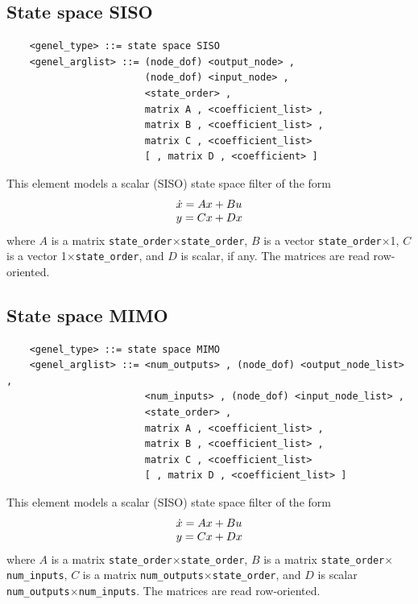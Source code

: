 \subsection{State space SISO}
\begin{verbatim}
    <genel_type> ::= state space SISO
    <genel_arglist> ::= (node_dof) <output_node> ,
                        (node_dof) <input_node> ,
                        <state_order> ,
                        matrix A , <coefficient_list> ,
                        matrix B , <coefficient_list> ,
                        matrix C , <coefficient_list>
                        [ , matrix D , <coefficient> ]
\end{verbatim}
This element models a scalar (SISO) state space filter of the form
\begin{displaymath}
    \begin{array}{l}  
        \dot{x} = Ax+Bu \\
	y = Cx+Dx
     \end{array}
\end{displaymath}
where $ A $ is a matrix \texttt{state\_order}$\times$\texttt{state\_order},
$ B $ is a vector \texttt{state\_order}$\times$1,
$ C $ is a vector 1$\times$\texttt{state\_order},
and $ D $ is scalar, if any.
The matrices are read row-oriented.

\subsection{State space MIMO}
\begin{verbatim}
    <genel_type> ::= state space MIMO
    <genel_arglist> ::= <num_outputs> , (node_dof) <output_node_list> ,
                        <num_inputs> , (node_dof) <input_node_list> ,
                        <state_order> ,
                        matrix A , <coefficient_list> ,
                        matrix B , <coefficient_list> ,
                        matrix C , <coefficient_list>
                        [ , matrix D , <coefficient_list> ]
\end{verbatim}
This element models a scalar (SISO) state space filter of the form
\begin{displaymath}
    \begin{array}{l}  
        \dot{x} = Ax+Bu \\
	y = Cx+Dx
     \end{array}
\end{displaymath}
where $ A $ is a matrix \texttt{state\_order}$\times$\texttt{state\_order},
$ B $ is a matrix \texttt{state\_order}$\times$\texttt{num\_inputs},
$ C $ is a matrix \texttt{num\_outputs}$\times$\texttt{state\_order},
and $ D $ is scalar \texttt{num\_outputs}$\times$\texttt{num\_inputs}.
The matrices are read row-oriented.




